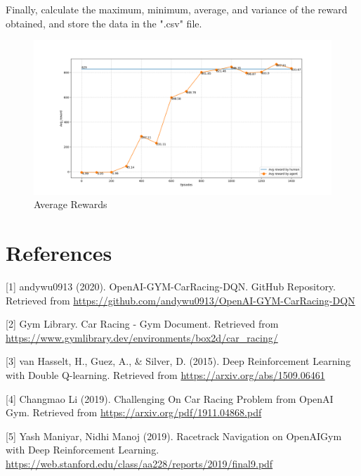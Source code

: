 \documentclass{article}
\begin{document}
Finally, calculate the maximum, minimum, average, and variance of the reward obtained, and 
store the data in the ".csv" file.





\clearpage  %

\begin{figure}[!h]
  \centering
  \includegraphics[scale=0.5]{../resource/chart.png}
  \caption{Average Rewards}
  \label{figure}
\end{figure}

\section*{References}

\small

[1] andywu0913 (2020). OpenAI-GYM-CarRacing-DQN. GitHub Repository. Retrieved from \url{https://github.com/andywu0913/OpenAI-GYM-CarRacing-DQN}

[2] Gym Library. Car Racing - Gym Document. Retrieved from \url{https://www.gymlibrary.dev/environments/box2d/car_racing/}

[3] van Hasselt, H., Guez, A., \& Silver, D. (2015). Deep Reinforcement Learning with Double Q-learning. Retrieved from \url{https://arxiv.org/abs/1509.06461}

[4] Changmao Li (2019). Challenging On Car Racing Problem from OpenAI Gym.
Retrieved from \url{https://arxiv.org/pdf/1911.04868.pdf}

[5] Yash Maniyar, Nidhi Manoj (2019). Racetrack Navigation on OpenAIGym with Deep Reinforcement Learning. \url{https://web.stanford.edu/class/aa228/reports/2019/final9.pdf}
\end{document}
